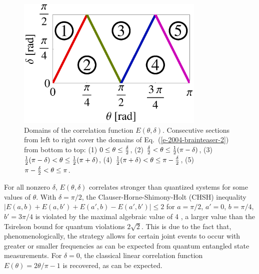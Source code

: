 \documentclass[prl,preprint,amsfonts,showpacs,showkeys]{revtex4}
\begin{document}
\begin{figure}[htbp]
  \centering
  \includegraphics[width=90mm]{2004-brainteaser-f2b}
  \caption{Domains of the correlation function $E(\theta ,\delta )$.
Consecutive sections from left to right cover the domains
           of Eq.~(\ref{e-2004-brainteaser-2}) from bottom to top:
(1) $0\le \theta \le {\delta \over 2}$,
(2) ${\delta \over 2} < \theta \le {1 \over 2}(\pi - \delta)$,
(3) ${1 \over 2}(\pi - \delta) < \theta \le {1 \over 2}(\pi   + \delta )$,
(4) ${1 \over 2}(\pi   + \delta )  < \theta \le \pi - {\delta \over 2}$,
(5) $\pi - {\delta \over 2} < \theta \le \pi$.
}
  \label{2004-brainteaser-f2b}
\end{figure}
For all nonzero $\delta$, $E(\theta ,\delta )$ correlates stronger than quantized systems
for some values of $\theta$.
With $\delta =\pi /2$, the Clauser-Horne-Shimony-Holt (CHSH) inequality
$
\vert
E({ a} ,{ b} )+
E({ a} ,{ b} ' )+
E({ a}' ,{ b} )-
E({a} ',{ b} ')
\vert
\le 2
$
for ${a} =\pi /2 $, ${a}'=0$, ${b} =\pi /4$, ${b}'= 3\pi /4$
is violated by the maximal algebraic value of 4 \cite{popescu-97b}, a larger value
than the Tsirelson bound for quantum violations $2\sqrt{2}$.
This is due to the fact that, phenomenologically, the strategy allows for
certain joint events to occur with greater or smaller frequencies as can be
expected from quantum entangled state measurements.
For $\delta =0$, the classical linear correlation function
$E(\theta )=  2\theta /\pi -1$ is recovered, as can be expected.
\end{document}
